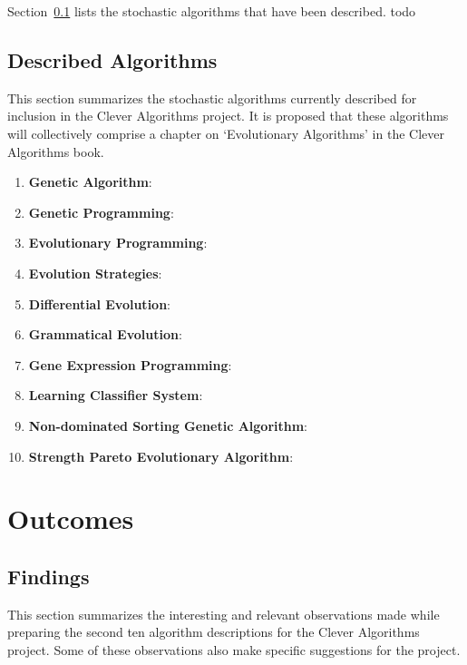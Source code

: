 \documentclass[a4paper, 11pt]{article}
\begin{document}
Section~\ref{subsec:algorithms} lists the stochastic algorithms that have been described. todo




% 
% 
\subsection{Described Algorithms}
\label{subsec:algorithms}
This section summarizes the stochastic algorithms currently described for inclusion in the Clever Algorithms project. It is proposed that these algorithms will collectively comprise a chapter on `Evolutionary Algorithms' in the Clever Algorithms book. 

\begin{enumerate}
	\item \textbf{Genetic Algorithm}: \cite{Brownlee2010p}
	\item \textbf{Genetic Programming}: \cite{Brownlee2010q}
	\item \textbf{Evolutionary Programming}: \cite{Brownlee2010r}
	\item \textbf{Evolution Strategies}: \cite{Brownlee2010s}
	\item \textbf{Differential Evolution}: \cite{Brownlee2010t}
	\item \textbf{Grammatical Evolution}: \cite{Brownlee2010u}
	\item \textbf{Gene Expression Programming}: \cite{Brownlee2010v}
	\item \textbf{Learning Classifier System}: \cite{Brownlee2010w}
	\item \textbf{Non-dominated Sorting Genetic Algorithm}: \cite{Brownlee2010x}
	\item \textbf{Strength Pareto Evolutionary Algorithm}: \cite{Brownlee2010y}
\end{enumerate}

% 
% 
\section{Outcomes}
\label{sec:outcomes}

% 
% 
\subsection{Findings}
This section summarizes the interesting and relevant observations made while preparing the second ten algorithm descriptions for the Clever Algorithms project. Some of these observations also make specific suggestions for the project. 
\end{document}

